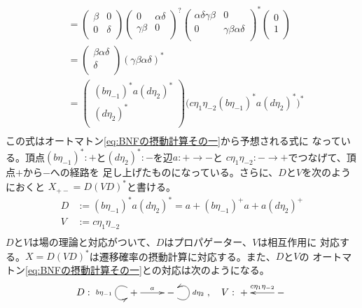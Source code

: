 {\begin{equation}
\begin{split}
		&= \begin{pmatrix}
			\beta & 0 \\ 0 & \delta \\
		\end{pmatrix} \begin{pmatrix}
			0 & \alpha\delta \\ \gamma\beta & 0 \\
		\end{pmatrix}^? \begin{pmatrix}
			\alpha\delta\gamma\beta & 0 \\ 0 & \gamma\beta\alpha\delta \\
		\end{pmatrix}^* \begin{pmatrix}
			0 \\ 1 \\
		\end{pmatrix} \\
		&= \begin{pmatrix}
			\beta\alpha\delta \\ \delta \\
		\end{pmatrix} (\gamma\beta\alpha\delta)^* \\
		&= \begin{pmatrix}
			(b\eta_{-1})^*a(d\eta_2)^* \\ (d\eta_2)^* \\
		\end{pmatrix} \bigl(c\eta_1\eta_{-2}(b\eta_{-1})^*a(d\eta_2)^*\bigr)^* \\
	\end{split}\end{equation}
	この式はオートマトン\eqref{eq:BNFの摂動計算その一}から予想される式に
	なっている。頂点$(b\eta_{-1})^*:+$と$(d\eta_{2})^*:-$を辺$a:+\to-$と
	$c\eta_{1}\eta_{-2}:-\to+$でつなげて、頂点$+$から$-$への経路を
	足し上げたものになっている。さらに、$D$と$V$を次のようにおくと
	$X_{+-}=D(VD)^*$と書ける。
	\begin{equation*}\begin{split}
		D &:= (b\eta_{-1})^*a(d\eta_{2})^*
			= a + (b\eta_{-1})^+a + a(d\eta_{2})^+ \\
		V &:= c\eta_{1}\eta_{-2} \\
	\end{split}\end{equation*}
	$D$と$V$は場の理論と対応がついて、$D$はプロパゲーター、$V$は相互作用に
	対応する。$X=D(VD)^*$は遷移確率の摂動計算に対応する。また、$D$と$V$の
	オートマトン\eqref{eq:BNFの摂動計算その一}との対応は次のようになる。
	\begin{equation*}\begin{split}
		D: \xymatrix {
			+ \ar@(ul,dl)_{b\eta_{-1}} \ar[r]^a & - \ar@(dr,ur)_{d\eta_{2}}
		},\quad V: \xymatrix {
			+ & - \ar[l]_{c\eta_1\eta_{-2}}
		} \\
	\end{split}\end{equation*}

}

